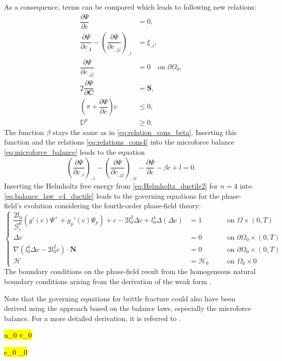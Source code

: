 As a consequence, terms can be compared which leads to following new relations:
\begin{equation} \label{eq:relations_cons4}
	\begin{aligned}
		\dfrac{\partial\Psi}{\partial\dot{c}} &= 0, \\
		\dfrac{\partial\Psi}{\partial c_{,\mathbf{i}}} -\left(\dfrac{\partial\Psi}{\partial c_{,jj}}\right)_{,i} &= \xi_{,i}, \\
		\dfrac{\partial\Psi}{\partial c_{,jj}} &= 0 \quad \text{on } \partial\Omega_{0}, \\
		2\dfrac{\partial\Psi}{\partial\mathbf{C}} &= \mathbf{S}, \\
		\left(\pi+\dfrac{\partial\Psi}{\partial c}\right)\dot{c} &\leq 0, \\
		\mathbb{D}^{p} &\geq 0.
	\end{aligned}
\end{equation}
The function $\beta$ stays the same as in \eqref{eq:relation_cons_beta}. Inserting this function and the relations \eqref{eq:relations_cons4} into the microforce balance \eqref{eq:microforce_balance} leads to the equation
\begin{equation} \label{eq:balance_law_c4_ductile}
	\left(\dfrac{\partial\Psi}{\partial c_{,i}}\right)_{,i}-\left(\dfrac{\partial\Psi}{\partial c_{,jj}}\right)_{,ii}-\dfrac{\partial\Psi}{\partial c}-\beta\dot{c}+l=0.
\end{equation}
Inserting the Helmholtz free energy from \eqref{eq:Helmholtz_ductile2} for $n=4$ into \eqref{eq:balance_law_c4_ductile} leads to the governing equations for the phase-field's evolution considering the fourth-order phase-field theory:
\begin{equation} \label{eq:c4_equil_ductile}
	\left\{\begin{alignedat}{2}
		\dfrac{2l_{0}}{\mathcal{G}_{c}^{0}}\left(g'\left(c\right)\Psi^{+}+g_{p}'\left(c\right)\Psi_{p}\right) + c - 2l_{0}^{2}\Delta c +l_{0}^{4}\Delta\left(\Delta c\right) &= 1 && \quad\text{on } \Omega\times\left(0,T\right) \\
		\Delta c &= 0 && \quad \text{on } \partial\Omega_{0}\times\left(0,T\right) \\
		\nabla\left(l_{0}^{4}\Delta c-2l_{0}^{2}c\right)\cdot\mathbf{N} &= 0 && \quad \text{on } \partial\Omega_{0}\times\left(0,T\right) \\
\mathcal{H} &= \mathcal{H}_{0} && \quad \text{on } \Omega_{0}\times0  
	\end{alignedat}\right.
\end{equation}
The boundary conditions on the phase-field result from the homogeneous natural boundary conditions arising from the derivation of the weak form \citep{11_PF_DissBorden}.

Note that the governing equations for brittle fracture could also have been derived using the approach based on the balance laws, especially the microforce balance. For a more detailed derivation, it is referred to \citep{11_PF_DissBorden}. 


\hl{ u_{0} \text{ } v_{0} }

\hl{ c_{0}  _{0} }
